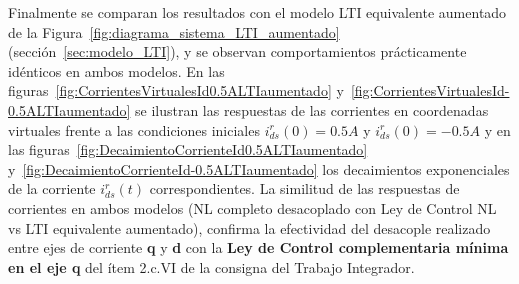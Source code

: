 \documentclass{article}
\begin{document}
Finalmente se comparan los resultados con el modelo LTI equivalente aumentado de la Figura~\ref{fig:diagrama_sistema_LTI_aumentado} (sección~\ref{sec:modelo_LTI}), y se observan comportamientos prácticamente idénticos en ambos modelos. En las figuras~\ref{fig:CorrientesVirtualesId0.5ALTIaumentado} y~\ref{fig:CorrientesVirtualesId-0.5ALTIaumentado} se ilustran las respuestas de las corrientes en coordenadas virtuales frente a las condiciones iniciales \(i^r_{ds}(0) = 0.5A\) y \(i^r_{ds}(0) = -0.5A\) y en las figuras~\ref{fig:DecaimientoCorrienteId0.5ALTIaumentado} y~\ref{fig:DecaimientoCorrienteId-0.5ALTIaumentado} los decaimientos exponenciales de la corriente \(i^r_{ds}(t)\) correspondientes. La similitud de las respuestas de corrientes en ambos modelos (NL completo desacoplado con Ley de Control NL vs LTI equivalente aumentado),
confirma la efectividad del desacople realizado entre ejes de corriente \textbf{q} y \textbf{d} con la \textbf{Ley de Control complementaria mínima en el eje q} del ítem 2.c.VI de la consigna del Trabajo Integrador.
\end{document}
